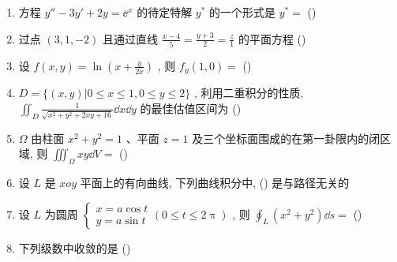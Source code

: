 \begin{enumerate}
	\item 方程 $y''-3 y'+2 y=\ee^{x}$ 的待定特解 $y^*$ 的一个形式是 $y^*=$ (\hspace{1pc})
	
	\item 过点 $(3,1,-2)$ 且通过直线 $\frac{x-4}{5}=\frac{y+3}{2}=\frac{z}{1}$ 的平面方程 (\hspace{1pc})
	
	\item 设 $f(x,y)=\ln\left(x+\frac{y}{2x} \right)$ , 则 $f_{y}(1,0)=$ (\hspace{1pc})
	
	\item $D=\{ (x,y)|0\leq x\leq 1,0\leq y\leq 2 \}$ , 利用二重积分的性质, $\iint_{D}\frac{1}{\sqrt{x^2+y^2+2xy+16}}\dd x\dd y$ 的最佳估值区间为 (\hspace{1pc})
	
	\item $\Omega$ 由柱面 $x^2+y^2=1$ 、平面 $z=1$ 及三个坐标面围成的在第一卦限内的闭区域, 则 $\iiint_{\Omega}xy\dd V=$ (\hspace{1pc})
	
	\item 设 $L$ 是 $xoy$ 平面上的有向曲线, 下列曲线积分中, (\hspace{1pc}) 是与路径无关的
	
	\item 设 $L$ 为圆周 $\begin{cases}
	x=a\cos t\\
	y=a\sin t
	\end{cases}(0\leq t\leq 2\uppi)$ , 则 $\oint_{L}\left(x^{2}+y^{2}\right) \dd s=$ (\hspace{1pc})
	
	\item 下列级数中收敛的是 (\hspace{1pc})
\end{enumerate}

